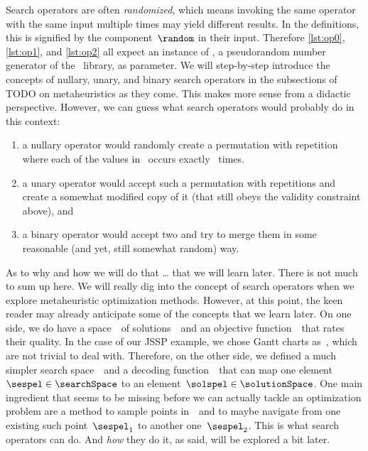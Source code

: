 Search operators are often \emph{randomized}, which means invoking the same operator with the same input multiple times may yield different results.
In the definitions, this is signified by the component~$\random$ in their input.
Therefore \autoref{lst:op0}, \ref{lst:op1}, and \ref{lst:op2} all expect an instance of \numpyGenerator, a pseudorandom number generator of the \numpy\ library, as parameter.
\endhsection%
%
%
%
We will step-by-step introduce the concepts of nullary, unary, and binary search operators in the subsections of TODO on metaheuristics as they come.
This makes more sense from a didactic perspective.
However, we can guess what search operators would probably do in this context:%
%
\begin{enumerate}%
\item a nullary operator would randomly create a permutation with repetition where each of the values in~ occurs exactly \jsspMachines~times.%
\item a unary operator would accept such a permutation with repetitions and create a somewhat modified copy of it (that still obeys the validity constraint above), and%
\item a binary operator would accept two and try to merge them in some reasonable (and yet, still somewhat random) way.%
\end{enumerate}%
%
As to why and how we will do that {\dots} that we will learn later.%
\endhsection%
%
%
There is not much to sum up here.
We will really dig into the concept of search operators when we explore metaheuristic optimization methods.
However, at this point, the keen reader may already anticipate some of the concepts that we learn later.
On one side, we do have a space~\solutionSpace\ of solutions~\solspel\ and an objective function~\objf\ that rates their quality.
In the case of our \gls{JSSP} example, we chose Gantt charts as~\solutionSpace, which are not trivial to deal with.
Therefore, on the other side, we defined a much simpler search space~\searchSpace\ and a decoding function~\decode\ that can map one element~$\sespel\in\searchSpace$ to an element~$\solspel\in\solutionSpace$.
One main ingredient that seems to be missing before we can actually tackle an optimization problem are a method to sample points in~\searchSpace\ and to maybe navigate from one existing such point~$\sespel_1$ to another one~$\sespel_2$.
This is what search operators can do.
And \emph{how} they do it, as said, will be explored a bit later.%
\endhsection%
\endhsection%
%
